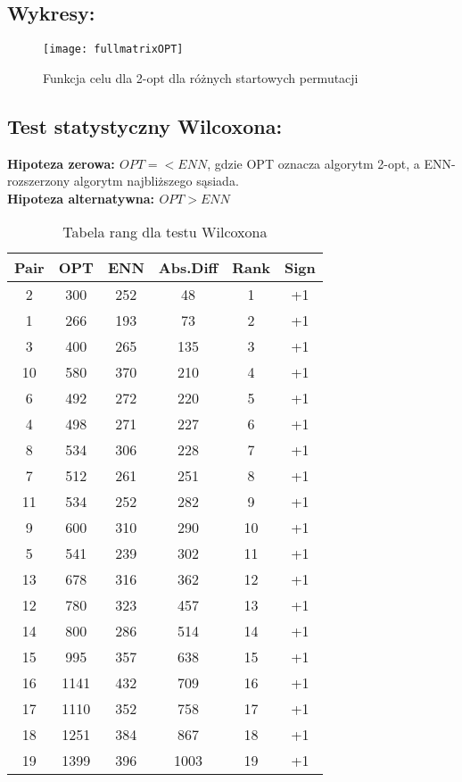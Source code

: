   \subsection{Wykresy: }
  \begin{figure}[H]
      \texttt{[image: fullmatrixOPT]}
      \centering
      \caption{Funkcja celu dla 2-opt dla różnych startowych permutacji}
    \end{figure}


  \subsection{Test statystyczny Wilcoxona: }
    \textbf{Hipoteza zerowa: $OPT =< ENN$}, gdzie OPT oznacza algorytm 2-opt, a ENN- rozszerzony algorytm najbliższego sąsiada. \\
    \textbf{Hipoteza alternatywna: $OPT > ENN$ }
    \begin{table}
    \begin{tabular}{|c | c | c | c | c | c |} 
     \hline
     Pair & OPT & ENN & Abs.Diff & Rank & Sign \\ [0.5ex] 
     \hline\hline
      2 & 300 & 252 & 48 & 1 & +1 \\
      1 & 266 & 193 & 73 & 2 & +1 \\
      3 &  400 & 265 & 135 & 3 & +1 \\
      10 & 580 & 370 & 210 & 4 & +1 \\
      6 & 492 & 272 & 220 & 5 & +1 \\
      4 & 498 & 271 & 227 & 6 & +1 \\
      8 & 534 & 306 & 228 & 7 & +1 \\
      7 & 512 & 261 & 251 & 8 & +1 \\
      11 & 534 & 252 & 282 & 9 & +1 \\
      9 & 600 & 310 & 290 & 10 & +1 \\
      5 & 541 & 239 & 302 & 11 & +1 \\
      13 & 678 & 316 & 362 & 12 & +1 \\
      12 & 780 & 323 & 457 & 13 & +1 \\
      14 & 800 & 286 & 514 & 14 & +1 \\
      15 & 995 & 357 & 638 & 15 & +1 \\
      16 & 1141 & 432 & 709 & 16 & +1 \\
      17& 1110 & 352 & 758 & 17 & +1 \\
      18& 1251 &384  & 867 & 18 & +1 \\
      19& 1399 & 396 & 1003 & 19 & +1 \\
     \hline
    \end{tabular}
    \caption{Tabela rang dla testu Wilcoxona}
    \end{table}

